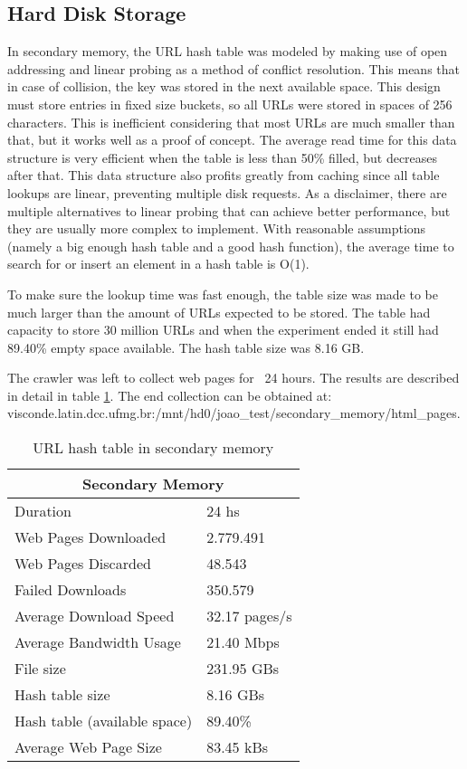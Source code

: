 \documentclass{report}
\begin{document}
\subsection{Hard Disk Storage}

In secondary memory, the URL hash table was modeled by making use of open addressing and linear probing as
a method of conflict resolution. This means that in case of collision, the key was stored in the next available space. 
This design must store entries in fixed size buckets, so all URLs were stored in spaces of 256 characters. 
This is inefficient considering that most URLs are much smaller than that, but it works well as a proof of concept. The average read
time for this data structure is very efficient when the table is less than 50\% filled, but decreases after that. This data structure
also profits greatly from caching since all table lookups are linear, preventing multiple disk requests. As a disclaimer, 
there are multiple alternatives to linear probing that can achieve better performance, but they are usually more complex to 
implement. With reasonable assumptions (namely a big enough hash table and a good hash function), the average time to
search for or insert an element in a hash table is O(1).

To make sure the lookup time was fast enough, the table size was made to be much larger than the amount of URLs 
expected to be stored. The table had capacity to store 30 million URLs and when the experiment ended it still had 89.40\% empty
space available. The hash table size was 8.16 GB.

The crawler was left to collect web pages for ~24 hours. The results are described
in detail in table \ref{tab:secondarymemory}. The end collection can be obtained at: \\
visconde.latin.dcc.ufmg.br:/mnt/hd0/joao\_test/secondary\_memory/html\_pages.

\begin{table}
\centering
\begin{tabular}{ |l|l| }
  \hline
  \multicolumn{2}{|c|}{Secondary Memory} \\
  \hline
  Duration & 24 hs \\
  Web Pages Downloaded & 2.779.491 \\
  Web Pages Discarded & 48.543 \\
  Failed Downloads & 350.579 \\
  Average Download Speed & 32.17 pages/s \\
  Average Bandwidth Usage & 21.40 Mbps \\
  File size & 231.95 GBs \\
  Hash table size & 8.16 GBs \\
  Hash table (available space) & 89.40\% \\
  Average Web Page Size & 83.45 kBs \\
  \hline
\end{tabular}
\caption{URL hash table in secondary memory}
\label{tab:secondarymemory}
\end{table}
\end{document}
